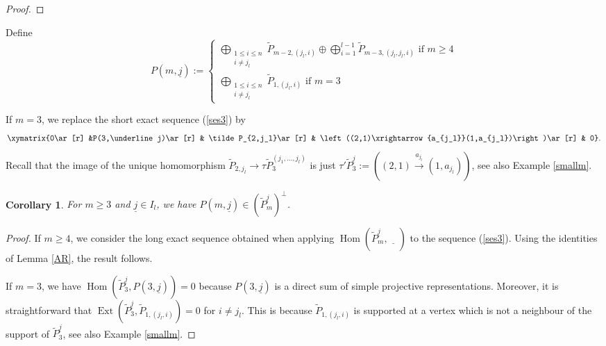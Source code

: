 \documentclass{amsart}
\newtheorem{corollary}[theorem]{Corollary}
\newcommand{\uj}{\underline j}
\newcommand{\Ext}{\operatorname{Ext}}
\newcommand{\Hom}{\operatorname{Hom}}
\begin{document}
\begin{proof}


\end{proof}
Define 
$$P(m,\uj):=\begin{cases}\bigoplus_{\substack{1\leq i\leq n\\i\neq j_l}}\tilde P_{m-2,(j_l,i)}\oplus \bigoplus_{i=1}^{l-1}\tilde P_{m-3,(j_l,j_l,i)}\text{ if }m\geq 4\\\bigoplus_{\substack{1\leq i\leq n\\i\neq j_l}}\tilde P_{1,(j_l,i)}\text{ if }m=3\end{cases}$$

If $m=3$, we replace the short exact sequence (\ref{ses3}) by
 \begin{align}
   \label{ses4}
   \xymatrix{0\ar[r] &P(3,\uj)\ar[r] &  \tilde P_{2,j_l}\ar[r] & \left((2,1)\xrightarrow{a_{j_l}}(1,a_{j_l})\right)\ar[r] & 0}.
 \end{align}
 Recall that the image of the unique homomorphism $\tilde P_{2,j_l}\to\tau\tilde P_{3}^{(j_1,\ldots,j_l)}$ is just $\tau'\tilde P_3^{\uj}:=\left((2,1)\xrightarrow{a_{j_l}}(1,a_{j_l})\right)$, see also Example \ref{smallm}. 

\begin{corollary}\label{cor: perpendicular}
For $m\geq 3$ and $\uj\in I_l$, we have $P(m,\uj)\in (\tilde P_{m}^{\uj})^\perp$.
\end{corollary}
\begin{proof}
If $m\geq 4$, we consider the long exact sequence obtained when applying $\Hom(\tilde P_{m}^{\uj},\underline{\quad})$ to the sequence (\ref{ses3}). Using the identities of Lemma \ref{AR}, the result follows.

If $m=3$, we have $\Hom(\tilde P_{3}^{\uj},P(3,\uj))=0$ because $P(3,\uj)$ is a direct sum of simple projective representations. Moreover, it is straightforward that 
$\Ext(\tilde P_{3}^{\uj},\tilde P_{1,(j_l,i)})=0$ for $i\neq j_l$. This is because $\tilde P_{1,(j_l,i)}$ is supported at a  vertex which is not a neighbour of the support of $\tilde P_{3}^{\uj}$, see also Example  \ref{smallm}.

\end{proof}
\end{document}
